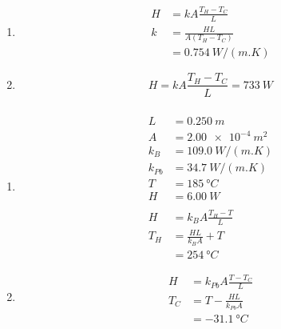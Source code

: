 \documentclass{article}
\begin{document}
\begin{enumerate}
  \item

        \begin{align*}
          H & = k A \frac{T_H - T_C}{L}   \\
          k & = \frac{H L}{A (T_H - T_C)} \\
            & = \qty{0.754}{W/(m.K)}
        \end{align*}

  \item \[H = k A \frac{T_H - T_C}{L} = \qty{733}{W}\]
\end{enumerate}

\subsubsection{}

\begin{enumerate}
  \item

        \begin{align*}
          L      & = \qty{0.250}{m}          \\
          A      & = \qty{2.00e-4}{m^2}      \\
          k_B    & = \qty{109.0}{W/(m.K)}    \\
          k_{Pb} & = \qty{34.7}{W/(m.K)}     \\
          T      & = \qty{185}{\degree C}    \\
          H      & = \qty{6.00}{W}           \\ \\
          H      & = k_B A \frac{T_H - T}{L} \\
          T_H    & = \frac{H L}{k_B A} + T   \\
                 & = \qty{254}{\degree C}
        \end{align*}

  \item

        \begin{align*}
          H   & = k_{Pb} A \frac{T - T_C}{L} \\
          T_C & = T - \frac{H L}{k_{Pb} A}   \\
              & = \qty{-31.1}{\degree C}
        \end{align*}
\end{enumerate}

\subsubsection{}
\end{document}
